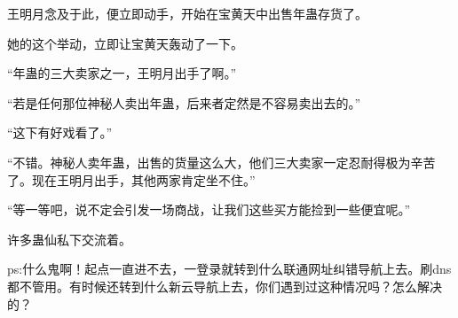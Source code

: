 \begin{this_body}
王明月念及于此，便立即动手，开始在宝黄天中出售年蛊存货了。

她的这个举动，立即让宝黄天轰动了一下。

“年蛊的三大卖家之一，王明月出手了啊。”

“若是任何那位神秘人卖出年蛊，后来者定然是不容易卖出去的。”

“这下有好戏看了。”

“不错。神秘人卖年蛊，出售的货量这么大，他们三大卖家一定忍耐得极为辛苦了。现在王明月出手，其他两家肯定坐不住。”

“等一等吧，说不定会引发一场商战，让我们这些买方能捡到一些便宜呢。”

许多蛊仙私下交流着。

ps:什么鬼啊！起点一直进不去，一登录就转到什么联通网址纠错导航上去。刷dns都不管用。有时候还转到什么新云导航上去，你们遇到过这种情况吗？怎么解决的？

\end{this_body}

